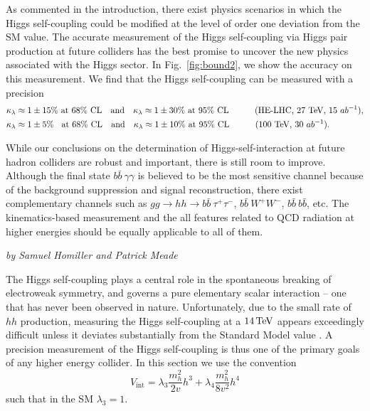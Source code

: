 As commented in the introduction, there exist physics scenarios 
in which the Higgs self-coupling could be modified at the level of order 
one deviation from the SM value. The accurate measurement of the 
Higgs self-coupling via Higgs pair production at future colliders has the 
best promise to uncover the new physics associated with the Higgs sector.
In Fig.~\ref{fig:bound2}, we show the accuracy on this measurement. 
We find that the Higgs self-coupling can be measured with a precision
% 
\begin{align}
\kappa_{\lambda} &\approx 1 \pm 15\% \text{    at 68\% CL}\quad \text{and} \quad
\kappa_{\lambda} \approx 1 \pm 30\%   \text{    at 95\% CL}\quad\quad\quad
\text{(HE-LHC, 27~TeV, $15~ab^{-1}$)}  , \notag \\
\kappa_{\lambda} &\approx 1 \pm 5\% \;\; \text{    at 68\% CL}\quad \text{and}\quad
\kappa_{\lambda} \approx 1 \pm 10\% \text{    at 95\% CL} \quad\quad\quad
\text{(100~TeV, $30~ab^{-1}$).} 
\end{align}

While our conclusions on the determination of Higgs-self-interaction
at future hadron colliders are robust and important, there is still
room to improve. Although the final state $b\bar b\ \gamma\gamma$ is
believed to be the most sensitive channel because of the background
suppression and signal reconstruction, there exist complementary
channels such as ${gg\to hh \to b\bar b\ \tau^+\tau^-}$, $b\bar
b\ W^+W^-$, $b\bar b\ b\bar b$, etc. The kinematics-based measurement
and the all features related to QCD radiation at higher energies
should be equally applicable to all of them.

\begin{center}
\textit{by Samuel Homiller and Patrick Meade}
\end{center}

The Higgs self-coupling plays a central role in the spontaneous breaking of electroweak symmetry, and governs a pure elementary scalar interaction -- one that has never been observed in nature. Unfortunately, due to the small rate of $hh$ production, measuring the Higgs self-coupling at a $14\, {\rm TeV}$ appears exceedingly difficult unless it deviates substantially from the Standard Model value \cite{ATL-PHYS-PUB-2014-019, ATL-PHYS-PUB-2017-001}. A precision measurement of the Higgs self-coupling is thus one of the primary goals of any higher energy collider.  In this section we use the convention
\begin{equation}\label{eq:v_int}
  V_{\text{int}} = \lambda_3\frac{m_h^2}{2v}h^3 + \lambda_4\frac{m_h^2}{8v^2}h^4
\end{equation}
such that in the SM $\lambda_3=1$.


